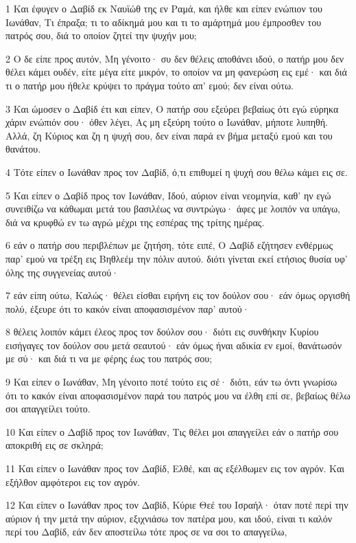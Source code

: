 \par 1 Και έφυγεν ο Δαβίδ εκ Ναυϊώθ της εν Ραμά, και ήλθε και είπεν ενώπιον του Ιωνάθαν, Τι έπραξα; τι το αδίκημά μου και τι το αμάρτημά μου έμπροσθεν του πατρός σου, διά το οποίον ζητεί την ψυχήν μου;
\par 2 Ο δε είπε προς αυτόν, Μη γένοιτο· συ δεν θέλεις αποθάνει ιδού, ο πατήρ μου δεν θέλει κάμει ουδέν, είτε μέγα είτε μικρόν, το οποίον να μη φανερώση εις εμέ· και διά τι ο πατήρ μου ήθελε κρύψει το πράγμα τούτο απ' εμού; δεν είναι ούτω.
\par 3 Και ώμοσεν ο Δαβίδ έτι και είπεν, Ο πατήρ σου εξεύρει βεβαίως ότι εγώ εύρηκα χάριν ενώπιόν σου· όθεν λέγει, Ας μη εξεύρη τούτο ο Ιωνάθαν, μήποτε λυπηθή. Αλλά, ζη Κύριος και ζη η ψυχή σου, δεν είναι παρά εν βήμα μεταξύ εμού και του θανάτου.
\par 4 Τότε είπεν ο Ιωνάθαν προς τον Δαβίδ, ό,τι επιθυμεί η ψυχή σου θέλω κάμει εις σε.
\par 5 Και είπεν ο Δαβίδ προς τον Ιωνάθαν, Ιδού, αύριον είναι νεομηνία, καθ' ην εγώ συνειθίζω να κάθωμαι μετά του βασιλέως να συντρώγω· άφες με λοιπόν να υπάγω, διά να κρυφθώ εν τω αγρώ μέχρι της εσπέρας της τρίτης ημέρας.
\par 6 εάν ο πατήρ σου περιβλέπων με ζητήση, τότε ειπέ, Ο Δαβίδ εζήτησεν ενθέρμως παρ' εμού να τρέξη εις Βηθλεέμ την πόλιν αυτού. διότι γίνεται εκεί ετήσιος θυσία υφ' όλης της συγγενείας αυτού·
\par 7 εάν είπη ούτω, Καλώς· θέλει είσθαι ειρήνη εις τον δούλον σου· εάν όμως οργισθή πολύ, έξευρε ότι το κακόν είναι αποφασισμένον παρ' αυτού·
\par 8 θέλεις λοιπόν κάμει έλεος προς τον δούλον σου· διότι εις συνθήκην Κυρίου εισήγαγες τον δούλον σου μετά σεαυτού· εάν όμως ήναι αδικία εν εμοί, θανάτωσόν με σύ· και διά τι να με φέρης έως του πατρός σου;
\par 9 Και είπεν ο Ιωνάθαν, Μη γένοιτο ποτέ τούτο εις σέ· διότι, εάν τω όντι γνωρίσω ότι το κακόν είναι αποφασισμένον παρά του πατρός μου να έλθη επί σε, βεβαίως θέλω σοι απαγγείλει τούτο.
\par 10 Και είπεν ο Δαβίδ προς τον Ιωνάθαν, Τις θέλει μοι απαγγείλει εάν ο πατήρ σου αποκριθή εις σε σκληρά;
\par 11 Και είπεν ο Ιωνάθαν προς τον Δαβίδ, Ελθέ, και ας εξέλθωμεν εις τον αγρόν. Και εξήλθον αμφότεροι εις τον αγρόν.
\par 12 Και είπεν ο Ιωνάθαν προς τον Δαβίδ, Κύριε Θεέ του Ισραήλ· όταν ποτέ περί την αύριον ή την μετά την αύριον, εξιχνιάσω τον πατέρα μου, και ιδού, είναι τι καλόν περί του Δαβίδ, εάν δεν αποστείλω τότε προς σε να σοι το απαγγείλω,
